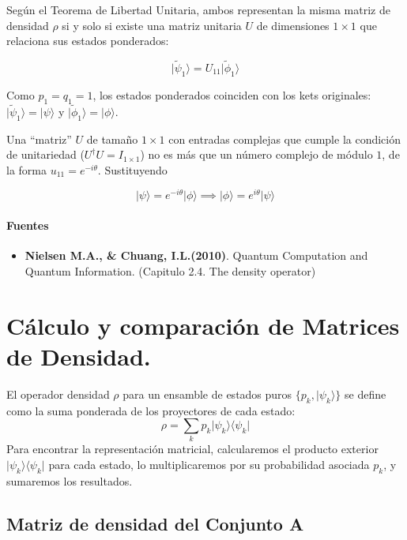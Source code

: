 \documentclass[11pt]{article}
\providecommand{\tightlist}{%
      \setlength{\itemsep}{0pt}\setlength{\parskip}{0pt}}
\begin{document}
Según el Teorema de Libertad Unitaria, ambos representan la misma matriz
de densidad \(\rho\) si y solo si existe una matriz unitaria \(U\) de
dimensiones \(1 \times 1\) que relaciona sus estados ponderados:

\[\vert{}\tilde{\psi}_1\rangle = U_{11} \vert{}\tilde{\phi}_1\rangle\]

Como \(p_1 = q_1 = 1\), los estados ponderados coinciden con los kets
originales: \(\vert{}\tilde{\psi}_1\rangle = \vert{}\psi\rangle\) y
\(\vert{}\tilde{\phi}_1\rangle = \vert{}\phi\rangle\).

Una ``matriz'' \(U\) de tamaño \(1 \times 1\) con entradas complejas que
cumple la condición de unitariedad (\(U^\dagger U = I_{1\times1}\)) no
es más que un número complejo de módulo \(1\), de la forma
\(u_{11} = e^{-i\theta}\). Sustituyendo

\[\vert{}\psi\rangle = e^{-i\theta} \vert{}\phi\rangle \implies \vert{}\phi\rangle = e^{i\theta} \vert{}\psi\rangle\]

\paragraph{Fuentes}\label{fuentes}

\begin{itemize}
\tightlist
\item
  \textbf{Nielsen M.A., \& Chuang, I.L.(2010)}. Quantum Computation and
  Quantum Information. (Capitulo 2.4. The density operator)
\end{itemize}

    \section{Cálculo y comparación de Matrices de
Densidad.}\label{cuxe1lculo-y-comparaciuxf3n-de-matrices-de-densidad.}

El operador densidad \(\rho\) para un ensamble de estados puros
\(\{p_k, \vert{}\psi_k\rangle\}\) se define como la suma ponderada de
los proyectores de cada estado:
\[\rho = \sum_k p_k \vert{}\psi_k\rangle\langle\psi_k\vert{}\] Para
encontrar la representación matricial, calcularemos el producto exterior
\(\vert{}\psi_k\rangle\langle\psi_k\vert{}\) para cada estado, lo
multiplicaremos por su probabilidad asociada \(p_k\), y sumaremos los
resultados.

    \subsection{Matriz de densidad del Conjunto
A}\label{matriz-de-densidad-del-conjunto-a}
\end{document}
